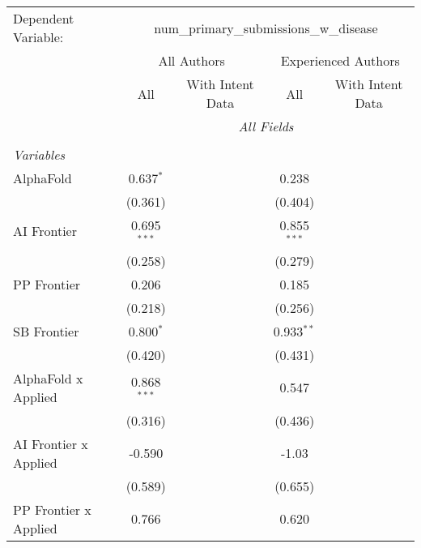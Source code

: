 \begingroup
\centering
\begin{tabular}{lcccccc}
   \tabularnewline \midrule \midrule
   Dependent Variable: & \multicolumn{6}{c}{num\_primary\_submissions\_w\_disease}\\
 & \multicolumn{3}{c}{All Authors} & \multicolumn{3}{c}{Experienced Authors} \\
\cmidrule(lr){2-4} \cmidrule(lr){5-7}
 & \multicolumn{1}{c}{All} & \multicolumn{2}{c}{With Intent Data} & \multicolumn{1}{c}{All} & \multicolumn{2}{c}{With Intent Data} \\
\cmidrule(lr){2-2} \cmidrule(lr){3-4} \cmidrule(lr){5-5} \cmidrule(lr){6-7}
 & \multicolumn{6}{c}{\textit{All Fields}} \\ \\
   \emph{Variables}\\
   AlphaFold             & 0.637$^{*}$   &         &         & 0.238         &         &   \\   
                         & (0.361)       &         &         & (0.404)       &         &   \\   
   AI Frontier           & 0.695$^{***}$ &         &         & 0.855$^{***}$ &         &   \\   
                         & (0.258)       &         &         & (0.279)       &         &   \\   
   PP Frontier           & 0.206         &         &         & 0.185         &         &   \\   
                         & (0.218)       &         &         & (0.256)       &         &   \\   
   SB Frontier           & 0.800$^{*}$   &         &         & 0.933$^{**}$  &         &   \\   
                         & (0.420)       &         &         & (0.431)       &         &   \\   
   AlphaFold x Applied   & 0.868$^{***}$ &         &         & 0.547         &         &   \\   
                         & (0.316)       &         &         & (0.436)       &         &   \\   
   AI Frontier x Applied & -0.590        &         &         & -1.03         &         &   \\   
                         & (0.589)       &         &         & (0.655)       &         &   \\   
   PP Frontier x Applied & 0.766         &         &         & 0.620         &         &   \\   

\end{tabular}
